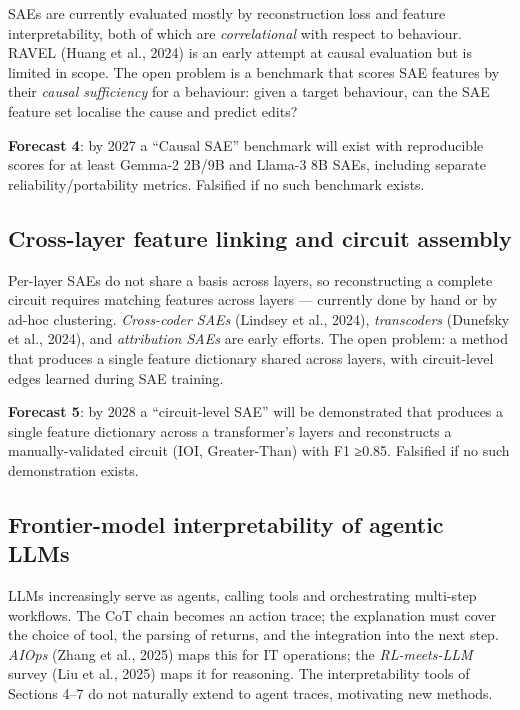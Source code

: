 SAEs are currently evaluated mostly by reconstruction loss and feature interpretability, both of which are \emph{correlational} with respect to behaviour. RAVEL (Huang et al., 2024) is an early attempt at causal evaluation but is limited in scope. The open problem is a benchmark that scores SAE features by their \emph{causal sufficiency} for a behaviour: given a target behaviour, can the SAE feature set localise the cause and predict edits?

\textbf{Forecast 4}: by 2027 a ``Causal SAE'' benchmark will exist with reproducible scores for at least Gemma-2 2B/9B and Llama-3 8B SAEs, including separate reliability/portability metrics. Falsified if no such benchmark exists.

\subsection{Cross-layer feature linking and circuit assembly}\label{cross-layer-feature-linking-and-circuit-assembly}

Per-layer SAEs do not share a basis across layers, so reconstructing a complete circuit requires matching features across layers --- currently done by hand or by ad-hoc clustering. \emph{Cross-coder SAEs} (Lindsey et al., 2024), \emph{transcoders} (Dunefsky et al., 2024), and \emph{attribution SAEs} are early efforts. The open problem: a method that produces a single feature dictionary shared across layers, with circuit-level edges learned during SAE training.

\textbf{Forecast 5}: by 2028 a ``circuit-level SAE'' will be demonstrated that produces a single feature dictionary across a transformer's layers and reconstructs a manually-validated circuit (IOI, Greater-Than) with F1 ≥0.85. Falsified if no such demonstration exists.

\subsection{Frontier-model interpretability of agentic LLMs}\label{frontier-model-interpretability-of-agentic-llms}

LLMs increasingly serve as agents, calling tools and orchestrating multi-step workflows. The CoT chain becomes an action trace; the explanation must cover the choice of tool, the parsing of returns, and the integration into the next step. \emph{AIOps} (Zhang et al., 2025) maps this for IT operations; the \emph{RL-meets-LLM} survey (Liu et al., 2025) maps it for reasoning. The interpretability tools of Sections 4--7 do not naturally extend to agent traces, motivating new methods.

